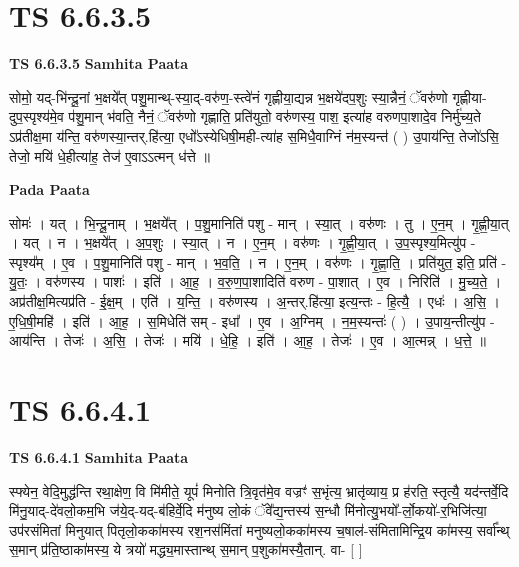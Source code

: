 \documentclass[17pt]{extarticle}
\begin{document}

\section{ TS 6.6.3.5 }

\textbf{TS 6.6.3.5 } \newline
\textbf{Samhita Paata} \newline

सोमो॒ यद्-भि॑न्दू॒नां भ॒क्षये᳚त् पशु॒मान्थ्-स्या॒द्-वरु॑ण॒-स्त्वे॑नं गृह्णीया॒द्यन्न भ॒क्षये॑दप॒शुः स्या॒न्नैनं॒ ॅवरु॑णो गृह्णीया-दुप॒स्पृश्य॑मे॒व प॑शु॒मान् भ॑वति॒ नैनं॒ ॅवरु॑णो गृह्णाति॒ प्रति॑युतो॒ वरु॑णस्य॒ पाश॒ इत्या॑ह वरुणपा॒शादे॒व निर्मु॑च्य॒ते ऽप्र॑तीक्ष॒मा य॑न्ति॒ वरु॑णस्या॒न्तर्.हि॑त्या॒ एधो᳚ऽस्येधिषी॒मही-त्या॑ह स॒मिधै॒वाग्निं न॑म॒स्यन्त॑ ( ) उ॒पाय॑न्ति॒ तेजो॑ऽसि॒ तेजो॒ मयि॑ धे॒हीत्या॑ह॒ तेज॑ ए॒वाऽऽत्मन् ध॑त्ते ॥ \newline

\textbf{Pada Paata} \newline

सोमः॑ । यत् । भि॒न्दू॒नाम् । भ॒क्षये᳚त् । प॒शु॒मानिति॑ पशु - मान् । स्या॒त् । वरु॑णः । तु । ए॒न॒म् । गृ॒ह्णी॒या॒त् । यत् । न । भ॒क्षये᳚त् । अ॒प॒शुः । स्या॒त् । न । ए॒न॒म् । वरु॑णः । गृ॒ह्णी॒या॒त् । उ॒प॒स्पृश्य॒मित्यु॑प - स्पृश्य᳚म् । ए॒व । प॒शु॒मानिति॑ पशु - मान् । भ॒व॒ति॒ । न । ए॒न॒म् । वरु॑णः । गृ॒ह्णा॒ति॒ । प्रति॑युत॒ इति॒ प्रति॑ - यु॒तः॒ । वरु॑णस्य । पाशः॑ । इति॑ । आ॒ह॒ । व॒रु॒ण॒पा॒शादिति॑ वरुण - पा॒शात् । ए॒व । निरिति॑ । मु॒च्य॒ते॒ । अप्र॑तीक्ष॒मित्यप्र॑ति - ई॒क्ष॒म् । एति॑ । य॒न्ति॒ । वरु॑णस्य । अ॒न्तर्.हि॑त्या॒ इत्य॒न्तः - हि॒त्यै॒ । एधः॑ । अ॒सि॒ । ए॒धि॒षी॒महि॑ । इति॑ । आ॒ह॒ । स॒मिधेति॑ सम् - इधा᳚ । ए॒व । अ॒ग्निम् । न॒म॒स्यन्तः॑ ( ) । उ॒पाय॒न्तीत्यु॑प - आय॑न्ति । तेजः॑ । अ॒सि॒ । तेजः॑ । मयि॑ । धे॒हि॒ । इति॑ । आ॒ह॒ । तेजः॑ । ए॒व । आ॒त्मन्न् । ध॒त्ते॒ ॥  \newline





\section{ TS 6.6.4.1 }

\textbf{TS 6.6.4.1 } \newline
\textbf{Samhita Paata} \newline

स्फ्येन॒ वेदि॒मुद्ध॑न्ति रथा॒क्षेण॒ वि मि॑मीते॒ यूपं॑ मिनोति त्रि॒वृत॑मे॒व वज्रꣳ॑ स॒भृंत्य॒ भ्रातृ॑व्याय॒ प्र ह॑रति॒ स्तृत्यै॒ यद॑न्तर्वे॒दि मि॑नु॒याद्-दे॑वलो॒कम॒भि ज॑ये॒द्-यद्-ब॑हिर्वे॒दि म॑नुष्य लो॒कं ॅवे᳚द्य॒न्तस्य॑ स॒न्धौ मि॑नोत्यु॒भयो᳚-र्लो॒कयो॑-र॒भिजि॑त्या॒ उप॑रसंमितां मिनुयात् पितृलो॒कका॑मस्य रश॒नस॑मिंतां मनुष्यलो॒कका॑मस्य च॒षाल॑-संमितामिन्द्रि॒य का॑मस्य॒ सर्वा᳚न्थ् स॒मान् प्र॑ति॒ष्ठाका॑मस्य॒ ये त्रयो॑ मद्ध्य॒मास्तान्थ् स॒मान् प॒शुका॑मस्यै॒तान्. वा- [  ] \newline
\end{document}
